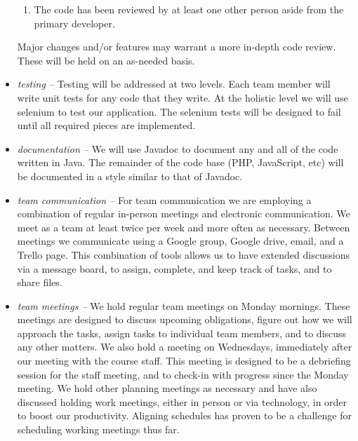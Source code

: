 \documentclass{extarticle}
\begin{document}
\begin{itemize}
\begin{enumerate}
    \item The code has been reviewed by at least one other person aside from the primary developer.
\end{enumerate}
Major changes and/or features may warrant a more in-depth code review. These will be held on an as-needed basis.
\item \emph{testing -- }Testing will be addressed at two levels.  Each team member will write unit tests for any
code that they write.  At the holistic level we will use selenium to test our application.  The selenium tests will
be designed to fail until all required pieces are implemented.
\item \emph{documentation -- }We will use Javadoc to document any and all of the code written in Java.  The
remainder of the code base (PHP, JavaScript, etc) will be documented in a style similar to that of Javadoc.
\item \emph{team communication -- }For team communication we are employing a combination of regular in-person
meetings and electronic communication.  We meet as a team at least twice per week and more often as necessary.
Between meetings we communicate using a Google group, Google drive, email, and a Trello page.  This combination of
tools allows us to have extended discussions via a message board, to assign, complete, and keep track of tasks,
and to share files.
\item \emph{team meetings -- }We hold regular team meetings on Monday mornings.  These meetings are designed to
discuss upcoming obligations, figure out how we will approach the tasks, assign tasks to individual team members,
and to discuss any other matters.  We also hold a meeting on Wednesdays, immediately after our meeting with the
course staff. This meeting is designed to be a debriefing session for the staff meeting, and to check-in with
progress since the Monday meeting.  We hold other planning meetings as necessary and have also discussed holding
work meetings, either in person or via technology, in order to boost our productivity.  Aligning schedules has
proven to be a challenge for scheduling working meetings thus far.
\end{itemize}

\newpage
\end{document}
